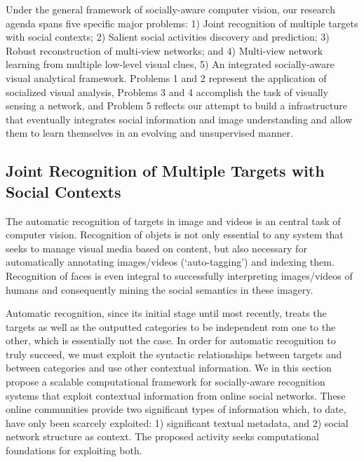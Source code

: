 \label{sec:proposed-research}

Under the general framework of socially-aware computer vision, our research agenda spans five specific major problems: 1) Joint recognition of multiple targets with social contexts; 2) Salient social activities discovery and prediction; 3) Robust reconstruction of multi-view networks; and 4) Multi-view network learning from multiple low-level visual clues, 5) An integrated socially-aware visual analytical framework. Problems 1 and 2 represent the application of socialized visual analysis, Problems 3 and 4 accomplish the task of visually sensing a network, and Problem 5 reflects our attempt to build a infrastructure that eventually integrates social information and image understanding and allow them to learn themselves in an evolving and unsupervised manner.

\subsection{Joint Recognition of Multiple Targets with Social Contexts}
\label{sec:recognition}

The automatic recognition of targets in image and videos is an central task of computer vision. Recognition of objets is not only essential to any system that seeks to manage visual media based on content, but also necessary for automatically annotating images/videos (`auto-tagging') and indexing them. Recognition of faces is even integral to successfully interpreting images/videos of humans and consequently mining the social semantics in these imagery.

Automatic recognition, since its initial stage until most recently, treats the targets as well as the outputted categories to be independent rom one to the other, which is essentially not the case. In order for automatic recognition to truly succeed, we must exploit the syntactic relationships between targets and between categories and use other contextual information. We in this section propose a scalable computational framework for socially-aware recognition systems that exploit contextual information from online social networks. These online communities provide two significant types of information which, to date, have only been scarcely exploited: 1) significant textual metadata, and 2) social network structure as context. The proposed activity seeks computational foundations for exploiting both.


